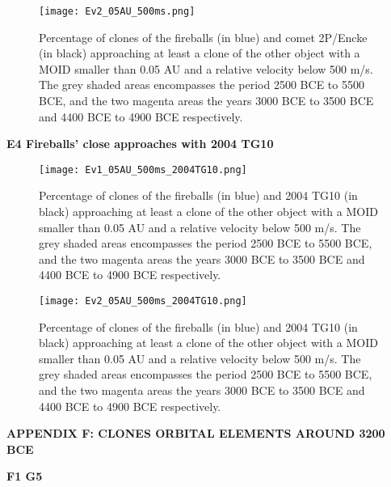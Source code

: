 \documentclass[a4paper,11pt]{article}
\begin{document}
\begin{figure*}[!ht]
  \centering
  \texttt{[image: Ev2\_05AU\_500ms.png]}
  \caption{Percentage of clones of the fireballs (in blue) and comet 2P/Encke (in black) approaching at least a clone of the other object with a MOID smaller than 0.05 AU and a relative velocity below 500 m/s. The grey shaded areas encompasses the period 2500 BCE to 5500 BCE, and the two magenta areas the years 3000 BCE to 3500 BCE and 4400 BCE to 4900 BCE respectively.}
  \label{fig:fireballs_without_peak_500ms}
\end{figure*}

\clearpage
\newpage
\textbf{E4  Fireballs' close approaches with 2004 TG10}\\

\begin{figure*}[!ht]
  \centering
  \texttt{[image: Ev1\_05AU\_500ms\_2004TG10.png]}
  \caption{Percentage of clones of the fireballs (in blue) and 2004 TG10 (in black) approaching at least a clone of the other object with a MOID smaller than 0.05 AU and a relative velocity below 500 m/s. The grey shaded areas encompasses the period 2500 BCE to 5500 BCE, and the two magenta areas the years 3000 BCE to 3500 BCE and 4400 BCE to 4900 BCE respectively.}
  \label{fig:fireballs1_2004TG10}
\end{figure*}

\begin{figure*}[!ht]
  \centering
  \texttt{[image: Ev2\_05AU\_500ms\_2004TG10.png]}
  \caption{Percentage of clones of the fireballs (in blue) and 2004 TG10 (in black) approaching at least a clone of the other object with a MOID smaller than 0.05 AU and a relative velocity below 500 m/s. The grey shaded areas encompasses the period 2500 BCE to 5500 BCE, and the two magenta areas the years 3000 BCE to 3500 BCE and 4400 BCE to 4900 BCE respectively.}
  \label{fig:fireballs2_2004TG10}
\end{figure*}

\clearpage
\textbf{APPENDIX F: CLONES ORBITAL ELEMENTS AROUND 3200 BCE}\\ \label{appendix:clones_selected} 

\textbf{F1  G5}\\
\end{document}
